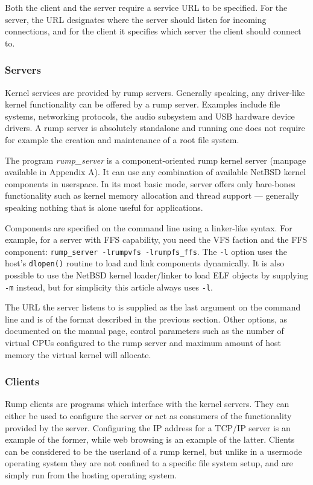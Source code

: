 Both the client and the server require a service URL to be specified.
For the server, the URL designates where the server should listen
for incoming connections, and for the client it specifies which server
the client should connect to.

\subsubsection{Servers}

Kernel services are provided by rump servers.  Generally speaking,
any driver-like kernel functionality can be offered by a rump
server.  Examples include file systems, networking protocols, the
audio subsystem and USB hardware device drivers.  A rump server is
absolutely standalone and running one does not require for example
the creation and maintenance of a root file system.

The program \textit{rump\_server} is a component-oriented rump
kernel server (manpage available in Appendix A).  It can use any
combination of available NetBSD kernel components in userspace.
In its most basic mode, server offers only bare-bones functionality
such as kernel memory allocation and thread support --- generally
speaking nothing that is alone useful for applications.

Components are specified on the command line using a
linker-like syntax.  For example, for a server with FFS capability,
you need the VFS faction and the FFS component:
\verb+rump_server -lrumpvfs -lrumpfs_ffs+.
The \verb+-l+ option uses the host's \verb+dlopen()+ routine to
load and link components dynamically.  It is also possible to use
the NetBSD kernel loader/linker to load ELF objects by supplying
\verb+-m+ instead, but for simplicity this article always uses
\verb+-l+.

The URL the server listens to is supplied as the last argument on
the command line and is of the format described in the previous
section.  Other options, as documented on the manual page, control
parameters such as the number of virtual CPUs configured to the
rump server and maximum amount of host memory the virtual kernel
will allocate.

\subsubsection{Clients}

Rump clients are programs which interface with the kernel servers.
They can either be used to configure the server
or act as consumers of the functionality provided by the server.
Configuring the IP address for a TCP/IP server is an example of
the former, while web browsing is an example of the latter.  Clients
can be considered to be the userland of a rump kernel, but unlike
in a usermode operating system they are not confined to a specific
file system setup, and are simply run from the hosting operating
system.

